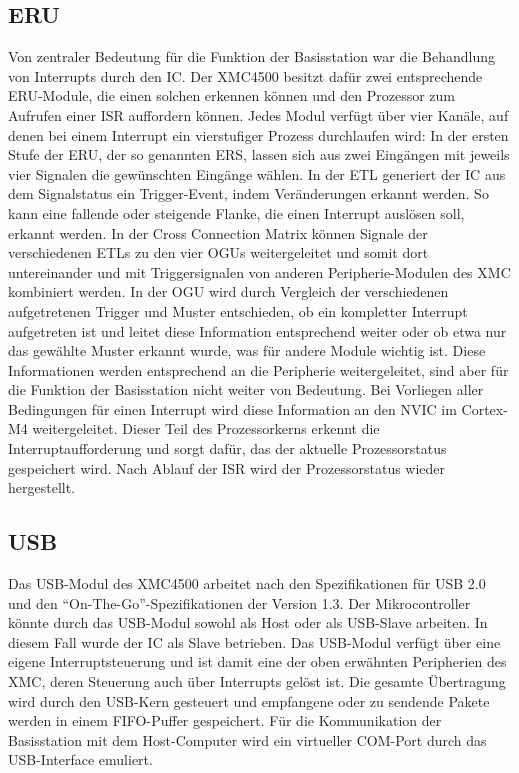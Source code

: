 \subsection{ERU}
Von zentraler Bedeutung für die Funktion der Basisstation war die Behandlung von Interrupts durch den  \ac{IC}. Der XMC4500 besitzt dafür zwei entsprechende \ac{ERU}-Module, die einen solchen erkennen können und den Prozessor zum Aufrufen einer \ac{ISR} auffordern können. Jedes Modul verfügt über vier Kanäle, auf denen  bei einem Interrupt ein vierstufiger Prozess durchlaufen wird: In der ersten Stufe der \ac{ERU}, der so genannten \ac{ERS}, lassen sich aus zwei Eingängen mit jeweils vier Signalen die gewünschten Eingänge wählen. In der \ac{ETL} generiert der \ac{IC} aus dem Signalstatus ein Trigger-Event, indem Veränderungen erkannt werden. So kann eine fallende oder steigende Flanke, die einen Interrupt auslösen soll, erkannt werden. In der Cross Connection Matrix können Signale der verschiedenen \acp{ETL} zu den vier \acp{OGU} weitergeleitet und somit dort untereinander und mit Triggersignalen von anderen Peripherie-Modulen des XMC kombiniert werden.  In der \ac{OGU} wird durch Vergleich der verschiedenen aufgetretenen Trigger und Muster entschieden, ob ein kompletter Interrupt aufgetreten ist und leitet diese Information entsprechend weiter oder ob etwa nur das gewählte Muster erkannt wurde, was für andere Module wichtig ist. Diese Informationen werden entsprechend an die Peripherie weitergeleitet, sind aber für die Funktion der Basisstation nicht weiter von Bedeutung. 
Bei Vorliegen aller Bedingungen für einen Interrupt wird diese Information an den \ac{NVIC} im Cortex-M4 weitergeleitet. Dieser Teil des Prozessorkerns erkennt die Interruptaufforderung und sorgt dafür, das der aktuelle Prozessorstatus gespeichert wird. Nach Ablauf der \ac{ISR} wird der Prozessorstatus wieder hergestellt.

\subsection{USB}
Das \ac{USB}-Modul des XMC4500 arbeitet nach den  Spezifikationen für USB 2.0 und den \enquote{On-The-Go}-Spezifikationen der Version 1.3. Der Mikrocontroller könnte durch das \ac{USB}-Modul sowohl als Host oder als USB-Slave  arbeiten. In diesem Fall wurde der \ac{IC} als Slave betrieben. Das \ac{USB}-Modul verfügt über eine eigene Interruptsteuerung und ist damit eine der oben erwähnten Peripherien des XMC, deren Steuerung auch über Interrupts gelöst ist. Die gesamte Übertragung wird durch den \ac{USB}-Kern gesteuert und empfangene oder zu sendende Pakete werden in einem \ac{FIFO}-Puffer gespeichert. Für die Kommunikation der Basisstation mit dem Host-Computer wird ein virtueller COM-Port durch das \ac{USB}-Interface emuliert.

